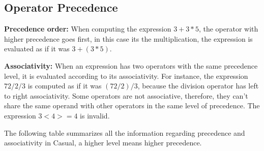 \documentclass[12pt]{article}
\begin{document}
\newpage

\subsection{Operator Precedence}

\textbf{Precedence order:} When computing the expression $3 + 3 * 5$, the operator with higher precedence goes first, in this case its the multiplication, the expression is  evaluated as if it was $3 + (3 * 5)$. 

\textbf{Associativity:} When an expression has two operators with the same precedence level, it is evaluated according to its associativity.  For instance, the expression $72 / 2 / 3$ is computed as if it was $(72 / 2) / 3$, because the division operator has left to right associativity. Some operators are not associative, therefore, they can't share the same operand with other operators in the same level of precedence. The expression $3 < 4 >= 4$ is invalid.

The following table summarizes all the information regarding precedence and associativity in Casual, a higher level means higher precedence.
\end{document}
